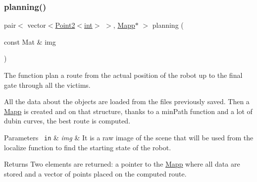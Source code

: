 \subsubsection{\texorpdfstring{planning()}{planning()}}
{\footnotesize\ttfamily pair$<$ vector$<$\mbox{\hyperlink{class_point2}{Point2}}$<$\mbox{\hyperlink{draw_8hh_aa620a13339ac3a1177c86edc549fda9b}{int}}$>$ $>$, \mbox{\hyperlink{class_mapp}{Mapp}}$\ast$ $>$ planning (\begin{DoxyParamCaption}\item[{const Mat \&}]{img }\end{DoxyParamCaption})}



The function plan a route from the actual position of the robot up to the final gate through all the victims. 

All the data about the objects are loaded from the files previously saved. Then a \mbox{\hyperlink{class_mapp}{Mapp}} is created and on that structure, thanks to a min\+Path function and a lot of dubin curves, the best route is computed.


\begin{DoxyParams}[1]{Parameters}
\mbox{\texttt{ in}}  & {\em img} & It is a raw image of the scene that will be used from the localize function to find the starting state of the robot. \\
\hline
\end{DoxyParams}
\begin{DoxyReturn}{Returns}
Two elements are returned\+: a pointer to the \mbox{\hyperlink{class_mapp}{Mapp}} where all data are stored and a vector of points placed on the computed route. 
\end{DoxyReturn}
